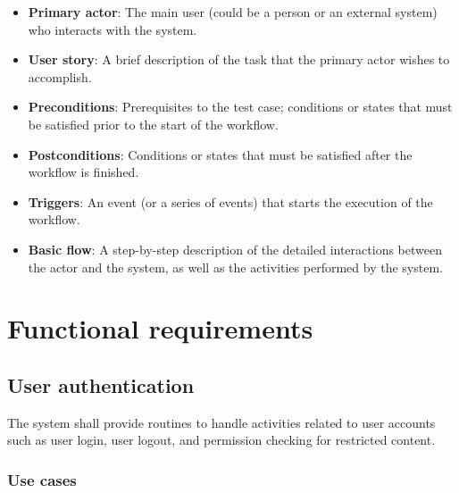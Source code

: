 \begin{itemize}

\item \textbf{Primary actor}:
The main user (could be a person or an external system) who interacts with the
system.

\item \textbf{User story}:
A brief description of the task that the primary actor wishes to accomplish.

\item \textbf{Preconditions}:
Prerequisites to the test case;
conditions or states that must be satisfied prior to the start of the workflow.

\item \textbf{Postconditions}:
Conditions or states that must be satisfied after the workflow is finished.

\item \textbf{Triggers}:
An event (or a series of events) that starts the execution of the workflow.

\item \textbf{Basic flow}:
A step-by-step description of the detailed interactions between the actor and
the system, as well as the activities performed by the system.

\end{itemize}

\section{Functional requirements}

\subsection{User authentication}

The system shall provide routines to handle activities related to user accounts
such as user login, user logout, and permission checking for restricted
content.

\subsubsection{Use cases}

